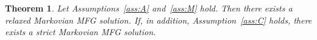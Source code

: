 \documentclass[11pt,amsfonts]{article}
\theoremstyle{plain}
\newtheorem{theorem}{Theorem}
\newtheorem{remark}{Remark}
\theoremstyle{assumpstyle}
\numberwithin{equation}{section}
\numberwithin{theorem}{section}
\numberwithin{proposition}{section}
\numberwithin{definition}{section}
\numberwithin{remark}{section}
\numberwithin{corollary}{section}
\numberwithin{lemma}{section}
\begin{document}



\begin{theorem}\label{theorem:Markovian}
Let Assumptions~\ref{ass:A} and~\ref{ass:M} hold. Then there exists a relaxed Markovian MFG solution. 
If, in addition, Assumption~\ref{ass:C} holds, there exists a \emph{strict} Markovian MFG solution.
\end{theorem}
\end{document}
